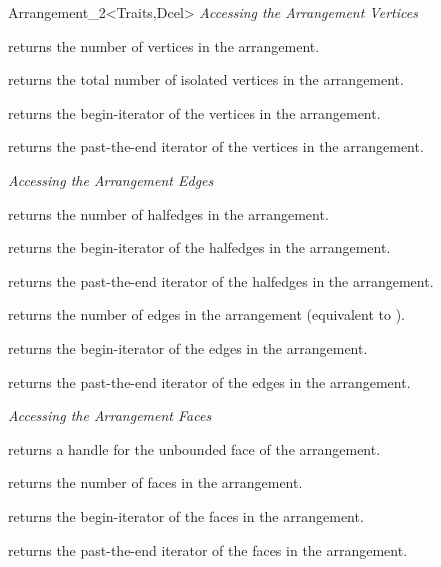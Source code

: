 \begin{ccRefClass}{Arrangement_2<Traits,Dcel>}
{\sl Accessing the Arrangement Vertices}

    {returns the number of vertices in the arrangement.}

    {returns the total number of isolated vertices in the arrangement.}

    {returns the begin-iterator of the vertices in the arrangement.}
    
    {returns the past-the-end iterator of the vertices in the arrangement.}

{\sl Accessing the Arrangement Edges}

    {returns the number of halfedges in the arrangement.}

    {returns the begin-iterator of the halfedges in the arrangement.}
 
    {returns the past-the-end iterator of the halfedges in the arrangement.}

    {returns the number of edges in the arrangement (equivalent to
     ).}

    {returns the begin-iterator of the edges in the arrangement.}
 
    {returns the past-the-end iterator of the edges in the arrangement.}

{\sl Accessing the Arrangement Faces}

    {returns a handle for the unbounded face of the arrangement.}

    {returns the number of faces in the arrangement.}

    {returns the begin-iterator of the faces in the arrangement.}
    
    {returns the past-the-end iterator of the faces in the arrangement.}
    

\begin{ccAdvanced}


\end{ccAdvanced}
\end{ccRefClass}
